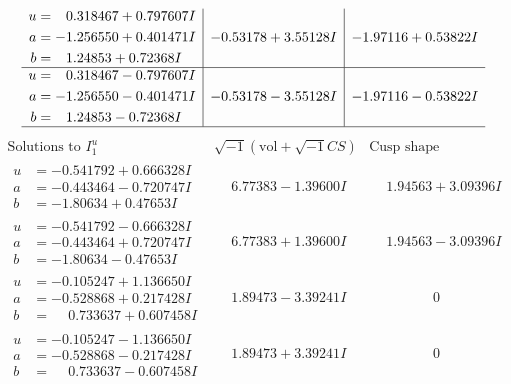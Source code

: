 \documentclass[1p]{elsarticle_modified}
\theoremstyle{definition}
\newcommand{\I}{\sqrt{-1}}
\begin{document}
$$\begin{array}{c|c|c}
\begin{aligned}
u &= \phantom{-}0.318467 + 0.797607 I \\
a &= -1.256550 + 0.401471 I \\
b &= \phantom{-}1.24853 + 0.72368 I\end{aligned}
 & -0.53178 + 3.55128 I & -1.97116 + 0.53822 I \\ \hline\begin{aligned}
u &= \phantom{-}0.318467 - 0.797607 I \\
a &= -1.256550 - 0.401471 I \\
b &= \phantom{-}1.24853 - 0.72368 I\end{aligned}
 & -0.53178 - 3.55128 I & -1.97116 - 0.53822 I\\
 \hline 
 \end{array}$$\newpage$$\begin{array}{c|c|c}  
\text{Solutions to }I^u_{1}& \I (\text{vol} + \sqrt{-1}CS) & \text{Cusp shape}\\
 \hline 
\begin{aligned}
u &= -0.541792 + 0.666328 I \\
a &= -0.443464 - 0.720747 I \\
b &= -1.80634 + 0.47653 I\end{aligned}
 & \phantom{-}6.77383 - 1.39600 I & \phantom{-}1.94563 + 3.09396 I \\ \hline\begin{aligned}
u &= -0.541792 - 0.666328 I \\
a &= -0.443464 + 0.720747 I \\
b &= -1.80634 - 0.47653 I\end{aligned}
 & \phantom{-}6.77383 + 1.39600 I & \phantom{-}1.94563 - 3.09396 I \\ \hline\begin{aligned}
u &= -0.105247 + 1.136650 I \\
a &= -0.528868 + 0.217428 I \\
b &= \phantom{-}0.733637 + 0.607458 I\end{aligned}
 & \phantom{-}1.89473 - 3.39241 I & \phantom{-0.000000 } 0 \\ \hline\begin{aligned}
u &= -0.105247 - 1.136650 I \\
a &= -0.528868 - 0.217428 I \\
b &= \phantom{-}0.733637 - 0.607458 I\end{aligned}
 & \phantom{-}1.89473 + 3.39241 I & \phantom{-0.000000 } 0 \\ \hline\begin{aligned}

\end{aligned}
\end{array}$$
\end{document}
